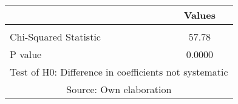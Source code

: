 
{
\begin{tabular}{lc} \hline
 & Values \\ \hline
 &  \\
Chi-Squared Statistic & 57.78 \\
P value & 0.0000 \\ \hline
\multicolumn{2}{c}{Test of H0: Difference in coefficients not systematic} \\
\multicolumn{2}{c}{Source: Own elaboration} \\
\end{tabular}
}
